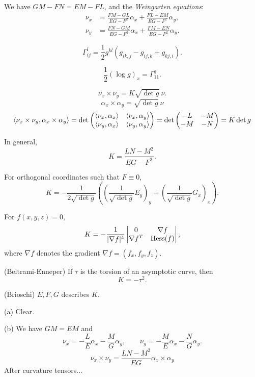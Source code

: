 \documentclass{../../large}
\begin{document}
\begin{cor}
We have $GM-FN=EM-FL$, and the \emph{Weingarten equations}:
\begin{align*}
\nu_x&=\frac{FM-GL}{EG-F^2}\alpha_x+\frac{FL-EM}{EG-F^2}\alpha_y,\\
\nu_y&=\frac{FN-GM}{EG-F^2}\alpha_x+\frac{FM-EN}{EG-F^2}\alpha_y.
\end{align*}
\end{cor}



\begin{thm}
\[\Gamma_{ij}^l=\frac12g^{kl}(g_{ik,j}-g_{ij,k}+g_{kj,i}).\]
\end{thm}

\[\frac12(\log g)_x=\Gamma_{11}^1.\]

\[\nu_x\times\nu_y=K\sqrt{\det g}\ \nu.\]
\[\alpha_x\times\alpha_y=\sqrt{\det g}\ \nu\]
\[\<\nu_x\times\nu_y,\alpha_x\times\alpha_y\>=\det\mat{\<\nu_x,\alpha_x\>&\<\nu_x,\alpha_y\>\\\<\nu_y,\alpha_x\>&\<\nu_y,\alpha_y\>}=\det\mat{-L&-M\\-M&-N}=K\det g\]











\begin{prb}
\begin{parts}
\item
In general,
\[K=\frac{LN-M^2}{EG-F^2}.\]
\item
For orthogonal coordinates such that $F\equiv0$,
\[K=-\frac1{2\sqrt{\det g}}\left((\frac1{\sqrt{\det g}}E_y)_y+(\frac1{\sqrt{\det g}}G_x)_x\right).\]
\item
For $f(x,y,z)=0$,
\[K=-\frac1{|\nabla f|^4}\mat[v]{0&\nabla f\\\nabla f^T&\Hess(f)},\]
where $\nabla f$ denotes the gradient $\nabla f=(f_x,f_y,f_z)$.
\item(Beltrami-Enneper) If $\tau$ is the torsion of an asymptotic curve, then
\[K=-\tau^2.\]
\item(Brioschi) $E,F,G$ describes $K$.
\end{parts}
\end{prb}

\begin{pf}
(a) Clear.

(b)
We have $GM=EM$ and
\[\nu_x=-\frac LE\alpha_x-\frac MG\alpha_y,\qquad\nu_y=-\frac ME\alpha_x-\frac NG\alpha_y.\]
\[\nu_x\times\nu_y=\frac{LN-M^2}{EG}\alpha_x\times\alpha_y\]
After curvature tensors...

\end{pf}
\end{document}

